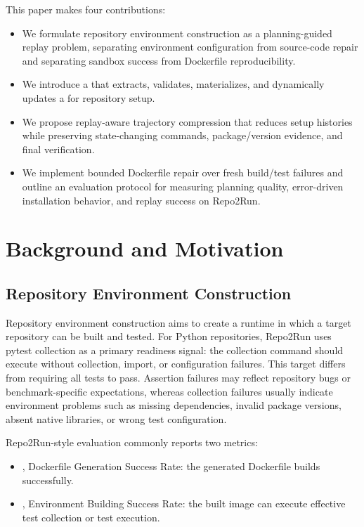 This paper makes four contributions:

\begin{itemize}[leftmargin=*]
  \item We formulate repository environment construction as a planning-guided replay problem, separating environment configuration from source-code repair and separating sandbox success from Dockerfile reproducibility.
  \item We introduce a \planner that extracts, validates, materializes, and dynamically updates a \ttg for repository setup.
  \item We propose replay-aware trajectory compression that reduces setup histories while preserving state-changing commands, package/version evidence, and final verification.
  \item We implement bounded Dockerfile repair over fresh build/test failures and outline an evaluation protocol for measuring planning quality, error-driven installation behavior, and replay success on Repo2Run.
\end{itemize}

\section{Background and Motivation}

\subsection{Repository Environment Construction}

Repository environment construction aims to create a runtime in which a target repository can be built and tested.
For Python repositories, Repo2Run uses pytest collection as a primary readiness signal: the collection command should execute without collection, import, or configuration failures.
This target differs from requiring all tests to pass.
Assertion failures may reflect repository bugs or benchmark-specific expectations, whereas collection failures usually indicate environment problems such as missing dependencies, invalid package versions, absent native libraries, or wrong test configuration.

Repo2Run-style evaluation commonly reports two metrics:

\begin{itemize}[leftmargin=*]
  \item \dgsr, Dockerfile Generation Success Rate: the generated Dockerfile builds successfully.
  \item \ebsr, Environment Building Success Rate: the built image can execute effective test collection or test execution.
\end{itemize}

